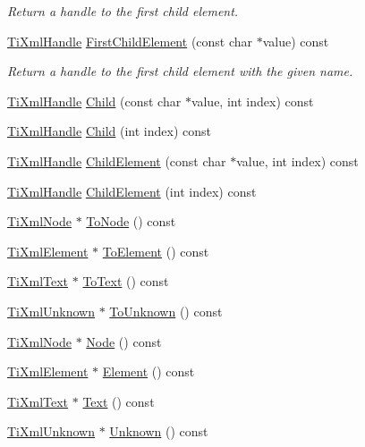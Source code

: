 \begin{DoxyCompactItemize}
\begin{DoxyCompactList}\small\item\em Return a handle to the first child element. \end{DoxyCompactList}\item 
\hypertarget{class_ti_xml_handle_af0aea751320f5e430fac6f8fff3b8dd4}{\hyperlink{class_ti_xml_handle}{Ti\+Xml\+Handle} \hyperlink{class_ti_xml_handle_af0aea751320f5e430fac6f8fff3b8dd4}{First\+Child\+Element} (const char $\ast$value) const }\label{class_ti_xml_handle_af0aea751320f5e430fac6f8fff3b8dd4}

\begin{DoxyCompactList}\small\item\em Return a handle to the first child element with the given name. \end{DoxyCompactList}\item 
\hyperlink{class_ti_xml_handle}{Ti\+Xml\+Handle} \hyperlink{class_ti_xml_handle_a072492b4be1acdb0db2d03cd8f71ccc4}{Child} (const char $\ast$value, int index) const 
\item 
\hyperlink{class_ti_xml_handle}{Ti\+Xml\+Handle} \hyperlink{class_ti_xml_handle_af9cf6a7d08a5da94a8924425ad0cd5ac}{Child} (int index) const 
\item 
\hyperlink{class_ti_xml_handle}{Ti\+Xml\+Handle} \hyperlink{class_ti_xml_handle_a979a3f850984a176ee884e394c7eed2d}{Child\+Element} (const char $\ast$value, int index) const 
\item 
\hyperlink{class_ti_xml_handle}{Ti\+Xml\+Handle} \hyperlink{class_ti_xml_handle_a8786475b9d1f1518492e3a46704c7ef0}{Child\+Element} (int index) const 
\item 
\hyperlink{class_ti_xml_node}{Ti\+Xml\+Node} $\ast$ \hyperlink{class_ti_xml_handle_af678e5088e83be67baf76f699756f2c3}{To\+Node} () const 
\item 
\hyperlink{class_ti_xml_element}{Ti\+Xml\+Element} $\ast$ \hyperlink{class_ti_xml_handle_abc6e7ed383a5fe1e52b0c0004b457b9e}{To\+Element} () const 
\item 
\hyperlink{class_ti_xml_text}{Ti\+Xml\+Text} $\ast$ \hyperlink{class_ti_xml_handle_a4ac53a652296203a5b5e13854d923586}{To\+Text} () const 
\item 
\hyperlink{class_ti_xml_unknown}{Ti\+Xml\+Unknown} $\ast$ \hyperlink{class_ti_xml_handle_a1381c17507a130767b1e23afc93b3674}{To\+Unknown} () const 
\item 
\hyperlink{class_ti_xml_node}{Ti\+Xml\+Node} $\ast$ \hyperlink{class_ti_xml_handle_ab44b723a8dc9af72838a303c079d0376}{Node} () const 
\item 
\hyperlink{class_ti_xml_element}{Ti\+Xml\+Element} $\ast$ \hyperlink{class_ti_xml_handle_acb5fe8388a526289ea65e817a51e05e7}{Element} () const 
\item 
\hyperlink{class_ti_xml_text}{Ti\+Xml\+Text} $\ast$ \hyperlink{class_ti_xml_handle_a9fc739c8a18d160006f82572fc143d13}{Text} () const 
\item 
\hyperlink{class_ti_xml_unknown}{Ti\+Xml\+Unknown} $\ast$ \hyperlink{class_ti_xml_handle_a49675b74357ba2aae124657a9a1ef465}{Unknown} () const 
\end{DoxyCompactItemize}



